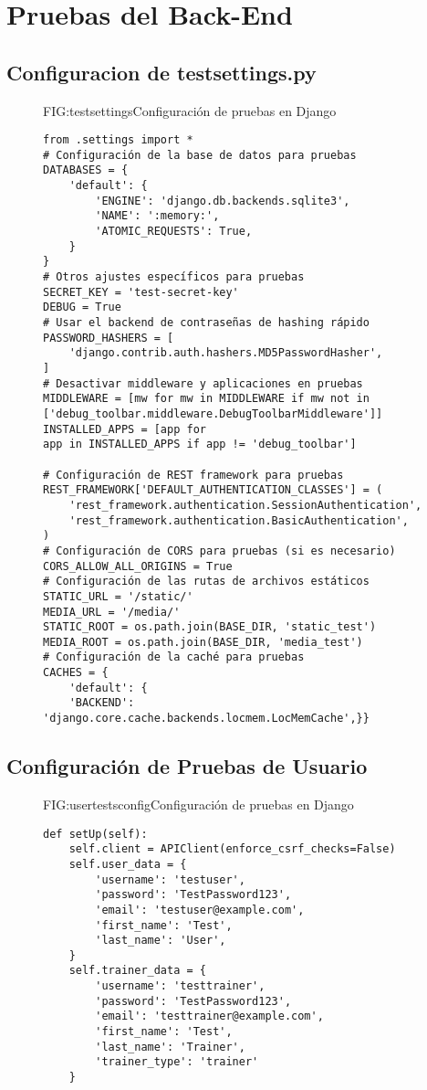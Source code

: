 \newpage
\section{Pruebas del Back-End\label{SEC:PRUEBASBACKEND}}

\subsection{Configuracion de testsettings.py}
\begin{figure}[Configuración de Pruebas]{FIG:testsettings}{Configuración de pruebas en Django}
    \begin{verbatim}
from .settings import *
# Configuración de la base de datos para pruebas
DATABASES = {
    'default': {
        'ENGINE': 'django.db.backends.sqlite3',
        'NAME': ':memory:',
        'ATOMIC_REQUESTS': True,
    }
}
# Otros ajustes específicos para pruebas
SECRET_KEY = 'test-secret-key'
DEBUG = True
# Usar el backend de contraseñas de hashing rápido
PASSWORD_HASHERS = [
    'django.contrib.auth.hashers.MD5PasswordHasher',
]
# Desactivar middleware y aplicaciones en pruebas
MIDDLEWARE = [mw for mw in MIDDLEWARE if mw not in 
['debug_toolbar.middleware.DebugToolbarMiddleware']]
INSTALLED_APPS = [app for 
app in INSTALLED_APPS if app != 'debug_toolbar']

# Configuración de REST framework para pruebas
REST_FRAMEWORK['DEFAULT_AUTHENTICATION_CLASSES'] = (
    'rest_framework.authentication.SessionAuthentication',
    'rest_framework.authentication.BasicAuthentication',
)
# Configuración de CORS para pruebas (si es necesario)
CORS_ALLOW_ALL_ORIGINS = True
# Configuración de las rutas de archivos estáticos
STATIC_URL = '/static/'
MEDIA_URL = '/media/'
STATIC_ROOT = os.path.join(BASE_DIR, 'static_test')
MEDIA_ROOT = os.path.join(BASE_DIR, 'media_test')
# Configuración de la caché para pruebas
CACHES = {
    'default': {
    'BACKEND': 'django.core.cache.backends.locmem.LocMemCache',}}
    \end{verbatim}
    \end{figure}

\newpage

\subsection{Configuración de Pruebas de Usuario}
\begin{figure}[Configuración de Pruebas]{FIG:usertestsconfig}{Configuración de pruebas en Django}
    \begin{verbatim}
def setUp(self):
    self.client = APIClient(enforce_csrf_checks=False)
    self.user_data = {
        'username': 'testuser',
        'password': 'TestPassword123',
        'email': 'testuser@example.com',
        'first_name': 'Test',
        'last_name': 'User',
    }
    self.trainer_data = {
        'username': 'testtrainer',
        'password': 'TestPassword123',
        'email': 'testtrainer@example.com',
        'first_name': 'Test',
        'last_name': 'Trainer',
        'trainer_type': 'trainer'
    }
    \end{verbatim}
    \end{figure}


